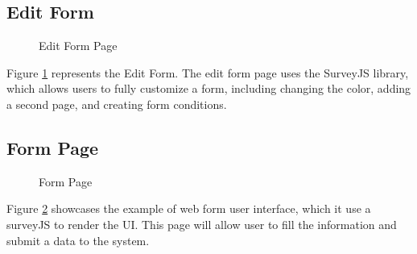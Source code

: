 \documentclass[12pt,oneside,openright,a4paper]{cpe-english-project}
\begin{document}
\subsection{Edit Form}

\begin{figure}[!h]
\centering
{}
\caption{Edit Form Page}\label{fig:edit-form}
\end{figure}

Figure \ref{fig:edit-form} represents the Edit Form. The edit form page uses the SurveyJS library, which allows users to fully customize a form, including changing the color, adding a second page, and creating form conditions.

\newpage
\subsection{Form Page}

\begin{figure}[!h]
\centering
{}
\caption{Form Page}\label{fig:form-page}
\end{figure}

Figure \ref{fig:form-page} showcases the example of web form user interface, which it use a surveyJS to render the UI. This  page will allow user to fill the information and submit a data to the system.
\end{document}
